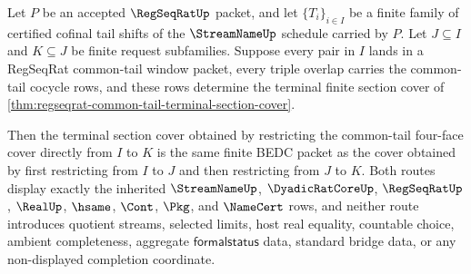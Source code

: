 \begin{theorem}
\label{thm:regseqrat-four-face-terminal-section-functoriality}
Let $P$ be an accepted $\RegSeqRatUp$ packet, and let $\{T_i\}_{i \in I}$ be a finite family of certified cofinal tail shifts of the $\StreamNameUp$ schedule carried by $P$. Let $J \subseteq I$ and $K \subseteq J$ be finite request subfamilies. Suppose every pair in $I$ lands in a RegSeqRat common-tail window packet, every triple overlap carries the common-tail cocycle rows, and these rows determine the terminal finite section cover of \autoref{thm:regseqrat-common-tail-terminal-section-cover}.

Then the terminal section cover obtained by restricting the common-tail four-face cover directly from $I$ to $K$ is the same finite BEDC packet as the cover obtained by first restricting from $I$ to $J$ and then restricting from $J$ to $K$. Both routes display exactly the inherited $\StreamNameUp$, $\DyadicRatCoreUp$, $\RegSeqRatUp$, $\RealUp$, $\hsame$, $\Cont$, $\Pkg$, and $\NameCert$ rows, and neither route introduces quotient streams, selected limits, host real equality, countable choice, ambient completeness, aggregate $\mathsf{formalstatus}$ data, standard bridge data, or any non-displayed completion coordinate.
\end{theorem}
